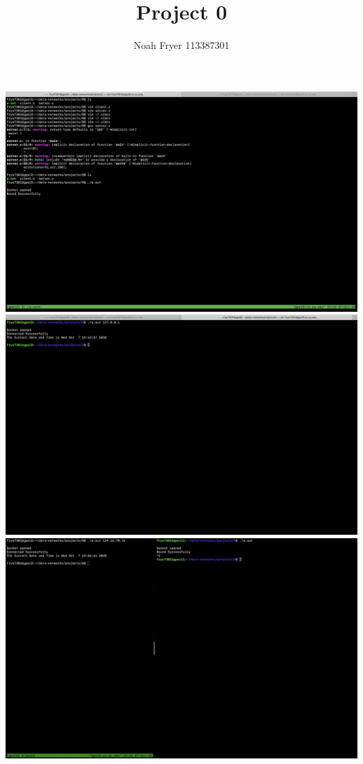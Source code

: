\documentclass[12pt,letterpaper]{article}
\author{Noah Fryer 113387301}
\title{Project 0}
\begin{document}
    \maketitle
    
    \includegraphics[scale=0.2]{server-client-local.png}
    \includegraphics[scale=0.2]{client-server-local.png}
    \includegraphics[scale=0.2]{client-server-across.png}
    
\end{document}
